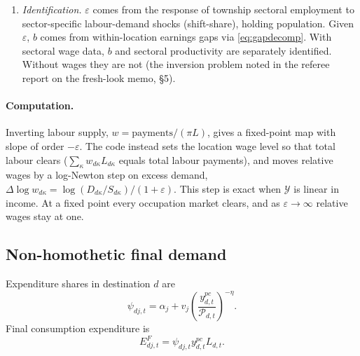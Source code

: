 \documentclass[11pt]{article}
\begin{document}
\begin{enumerate}[leftmargin=1.5em]
      model with Fr\'echet efficiency draws $z\sim$ Fr\'echet$(\varepsilon)$ and choice of
      $\max_\kappa b_{d\kappa}w_{d\kappa}z_{\kappa}$ (Lagakos--Waugh 2013; Hsieh et al.\ 2019).
      There, average earnings in occupation $\kappa$ are proportional to $\Phi_{d}/b_{d\kappa}$:
      with $b=1$ earnings per worker are equal across occupations, and selection lowers
      measured farm productivity. Here efficiency is homogeneous, so measured gaps are wage
      differences: compensating differentials plus a finite supply elasticity. We use the
      taste version because PIGL demand then aggregates over finitely many income groups.
      The Fr\'echet version is a tractable extension: PIGL needs
      $\mathbb{E}[y^{1-\eta}]=s^{1-\eta}\,\Gamma(1-(1-\eta)/\varepsilon)$ over a Fr\'echet
      income distribution with scale $s$. The two predict different earnings changes for
      workers who switch sector, which is what panel evidence on the gap uses (e.g.\ Hamory,
      Kleemans, Li and Miguel 2021).
\item \emph{Identification.} $\varepsilon$ comes from the response of township sectoral
      employment to sector-specific labour-demand shocks (shift-share), holding population.
      Given $\varepsilon$, $b$ comes from within-location earnings gaps via
      \eqref{eq:gapdecomp}. With sectoral wage data, $b$ and sectoral productivity are
      separately identified. Without wages they are not (the inversion problem noted in the
      referee report on the fresh-look memo, \S5).
\end{enumerate}

\paragraph{Computation.} Inverting labour supply, $w=\text{payments}/(\pi L)$, gives a
fixed-point map with slope of order $-\varepsilon$. The code instead sets the location wage
level so that total labour clears ($\sum_\kappa w_{d\kappa}L_{d\kappa}$ equals total labour
payments), and moves relative wages by a log-Newton step on excess demand,
$\Delta\log w_{d\kappa}=\log(D_{d\kappa}/S_{d\kappa})/(1+\varepsilon)$. This step is exact when
$\mathcal{Y}$ is linear in income. At a fixed point every occupation market clears, and as
$\varepsilon\to\infty$ relative wages stay at one.

\subsection{Non-homothetic final demand}
Expenditure shares in destination $d$ are
\begin{equation}
  \psi_{dj,t}
  = \alpha_j + v_j \left( \frac{y^{pc}_{d,t}}{\mathcal{P}_{d,t}} \right)^{-\eta}.
\end{equation}
Final consumption expenditure is
\begin{equation}
  E^{F}_{dj,t} = \psi_{dj,t} y^{pc}_{d,t} L_{d,t}.
\end{equation}
\end{document}
